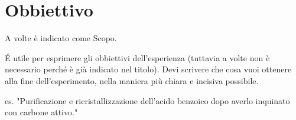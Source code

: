 \section{Obbiettivo}
A volte è indicato come Scopo.

\'E utile per esprimere gli obbiettivi dell'esperienza (tuttavia a volte non è necessario perché è già indicato nel titolo). Devi scrivere che cosa vuoi ottenere alla fine dell'esperimento, nella maniera più chiara e incisiva possibile.

es. "Purificazione e ricristallizzazione dell'acido benzoico dopo averlo inquinato con carbone attivo."